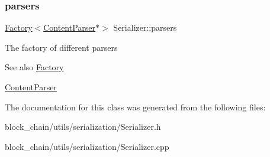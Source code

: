 \subsubsection{\texorpdfstring{parsers}{parsers}}
{\footnotesize\ttfamily \mbox{\hyperlink{classFactory}{Factory}}$<$\mbox{\hyperlink{classContentParser}{Content\+Parser}}$\ast$$>$ Serializer\+::parsers\hspace{0.3cm}{\ttfamily [protected]}}

The factory of different parsers \begin{DoxySeeAlso}{See also}
\mbox{\hyperlink{classFactory}{Factory}} 

\mbox{\hyperlink{classContentParser}{Content\+Parser}} 
\end{DoxySeeAlso}


The documentation for this class was generated from the following files\+:\begin{DoxyCompactItemize}
\item 
block\+\_\+chain/utils/serialization/Serializer.\+h\item 
block\+\_\+chain/utils/serialization/Serializer.\+cpp\end{DoxyCompactItemize}
